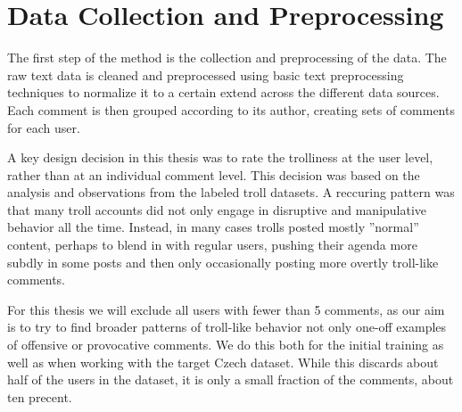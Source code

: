 \documentclass[twoside]{ctuthesis}
\theoremstyle{plain}
\theoremstyle{definition}
\theoremstyle{note}
\begin{document}
\section{Data Collection and Preprocessing}
The first step of the method is the collection and preprocessing of the data. The raw text data is cleaned and preprocessed using basic text preprocessing techniques to normalize it to a certain extend across the different data sources. Each comment is then grouped according to its author, creating sets of comments for each user.\par
A key design decision in this thesis was to rate the trolliness at the user level, rather than at an individual comment level. This decision was based on the analysis and observations from the labeled troll datasets. A reccuring pattern was that many troll accounts did not only engage in disruptive and manipulative behavior all the time. Instead, in many cases trolls posted mostly ''normal'' content, perhaps to blend in with regular users, pushing their agenda more subdly in some posts and then only occasionally posting more overtly troll-like comments.\par
For this thesis we will exclude all users with fewer than 5 comments, as our aim is to try to find broader patterns of troll-like behavior not only one-off examples of offensive or provocative comments. We do this both for the initial training as well as when working with the target Czech dataset. While this discards about half of the users in the dataset, it is only a small fraction of the comments, about ten precent.\par
\end{document}
